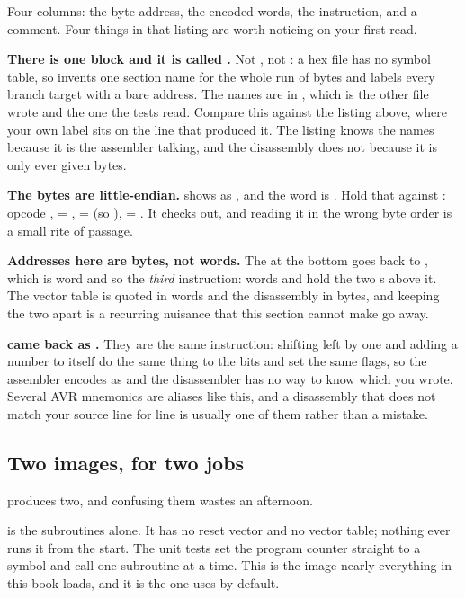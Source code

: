Four columns: the byte address, the encoded words, the instruction, and a comment. Four things in
that listing are worth noticing on your first read.

\textbf{There is one block and it is called .} Not , not
: a hex file has no symbol table, so  invents one section name
for the whole run of bytes and labels every branch target with a bare address. The names are in
, which is the other file  wrote and the one the tests read. Compare
this against the listing above, where your own label sits on the line that produced it. The
listing knows the names because it is the assembler talking, and the disassembly does not because
it is only ever given bytes.

\textbf{The bytes are little-endian.}  shows as , and the word is
. Hold that against : opcode ,  =
,  =  (so ),  = . It checks out,
and reading it in the wrong byte order is a small rite of passage.

\textbf{Addresses here are bytes, not words.} The  at the bottom goes back to
, which is word  and so the \emph{third} instruction: words  and
 hold the two s above it. The vector table is quoted in words and the
disassembly in bytes, and keeping the two apart is a recurring nuisance that this section cannot
make go away.

\textbf{ came back as .} They are the same instruction: shifting
left by one and adding a number to itself do the same thing to the bits and set the same flags,
so the assembler encodes  as  and the disassembler has no way to know which
you wrote. Several AVR mnemonics are aliases like this, and a disassembly that does not match your
source line for line is usually one of them rather than a mistake.

\subsection{Two images, for two jobs}
\label{c1:sec:images}
 produces two, and confusing them wastes an afternoon.

\textbf{} is the subroutines alone. It has no reset vector and no
vector table; nothing ever runs it from the start. The unit tests set the program counter
straight to a symbol and call one subroutine at a time. This is the image nearly everything in
this book loads, and it is the one  uses by default.


